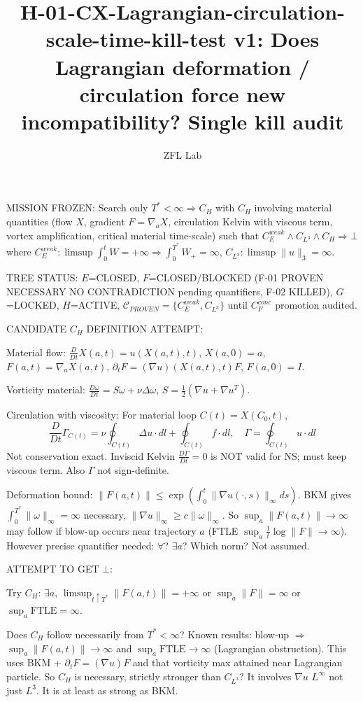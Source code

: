 \documentclass[11pt]{article}
\title{H-01-CX-Lagrangian-circulation-scale-time-kill-test v1: Does Lagrangian deformation / circulation force new incompatibility? Single kill audit}
\author{ZFL Lab}
\begin{document}
\maketitle

MISSION FROZEN: Search only $T^*<\infty\Rightarrow C_H$ with $C_H$ involving material quantities (flow $X$, gradient $F=\nabla_aX$, circulation Kelvin with viscous term, vortex amplification, critical material time-scale) such that $C_E^{weak}\land C_{L^3}\land C_H\Rightarrow\bot$ where $C_E^{weak}:\limsup\int_0^tW=+\infty\Rightarrow\int_0^{T^*}W_+=\infty$, $C_{L^3}:\limsup\|u\|_3=\infty$.

TREE STATUS: $E$=CLOSED, $F$=CLOSED/BLOCKED (F-01 PROVEN NECESSARY NO CONTRADICTION pending quantifiers, F-02 KILLED), $G$=LOCKED, $H$=ACTIVE, $\mathcal C_{PROVEN}=\{C_E^{weak},C_{L^3}\}$ until $C_F^{conc}$ promotion audited.

CANDIDATE $C_H$ DEFINITION ATTEMPT:

Material flow: $\frac{D}{Dt}X(a,t)=u(X(a,t),t)$, $X(a,0)=a$, $F(a,t)=\nabla_a X(a,t)$, $\partial_t F=(\nabla u)(X(a,t),t)F$, $F(a,0)=I$.

Vorticity material: $\frac{D\omega}{Dt}=S\omega+\nu\Delta\omega$, $S=\frac12(\nabla u+\nabla u^T)$.

Circulation with viscosity: For material loop $C(t)=X(C_0,t)$,
\begin{equation*}
\boxed{\frac{D}{Dt}\Gamma_{C(t)}=\nu\oint_{C(t)}\Delta u\cdot dl + \oint_{C(t)} f\cdot dl},\quad \Gamma=\oint_{C(t)}u\cdot dl
\end{equation*}
Not conservation exact. Inviscid Kelvin $\frac{D\Gamma}{Dt}=0$ is NOT valid for NS; must keep viscous term. Also $\Gamma$ not sign-definite.

Deformation bound: $\|F(a,t)\|\le\exp(\int_0^t\|\nabla u(\cdot,s)\|_\infty ds)$. BKM gives $\int_0^{T^*}\|\omega\|_\infty=\infty$ necessary, $\|\nabla u\|_\infty\ge c\|\omega\|_\infty$. So $\sup_a\|F(a,t)\|\to\infty$ may follow if blow-up occurs near trajectory $a$ (FTLE $\sup_a\frac1t\log\|F\|\to\infty$). However precise quantifier needed: $\forall$? $\exists a$? Which norm? Not assumed.

ATTEMPT TO GET $\bot$:

Try $C_H$: $\exists a$, $\limsup_{t\uparrow T^*}\|F(a,t)\|=+\infty$ or $\sup_a\|F\|=\infty$ or $\sup_a\text{FTLE}=\infty$.

Does $C_H$ follow necessarily from $T^*<\infty$? Known results: blow-up $\Rightarrow$ $\sup_a\|F(a,t)\|\to\infty$ and $\sup_a\text{FTLE}\to\infty$ (Lagrangian obstruction). This uses BKM + $\partial_tF=(\nabla u)F$ and that vorticity max attained near Lagrangian particle. So $C_H$ is necessary, strictly stronger than $C_{L^3}$? It involves $\nabla u$ $L^\infty$ not just $L^3$. It is at least as strong as BKM.
\end{document}

